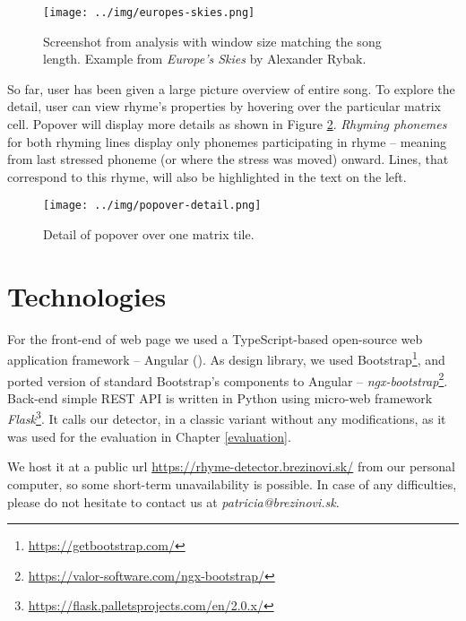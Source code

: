 \begin{figure}[!h]\centering
		\texttt{[image: ../img/europes-skies.png]}
	\caption[Screenshot from analysis with window size matching the song length.]{Screenshot from analysis with window size matching the song length. Example from \textit{Europe's Skies} by Alexander Rybak.}
	\label{web-analysis_window_all}
\end{figure}

So far, user has been given a large picture overview of entire song. To explore the detail, user can view rhyme's properties by hovering over the particular matrix cell. Popover will display more details as shown in Figure \ref{web-popover}. \textit{Rhyming phonemes} for both rhyming lines display only phonemes participating in rhyme -- meaning from last stressed phoneme (or where the stress was moved) onward. Lines, that correspond to this rhyme, will also be highlighted in the text on the left. 

\begin{figure}[h]\centering
		\texttt{[image: ../img/popover-detail.png]}
	\caption{Detail of popover over one matrix tile.}
	\label{web-popover}
\end{figure}


\section{Technologies}
For the front-end of web page we used a TypeScript-based open-source web application framework --  Angular (\cite{angular}). As design library, we used Bootstrap\footnote{\url{https://getbootstrap.com/}}, and ported version of standard Bootstrap's components to Angular -- \textit{ngx-bootstrap}\footnote{\url{https://valor-software.com/ngx-bootstrap/}}. Back-end simple REST API is written in Python using micro-web framework \textit{Flask}\footnote{\url{https://flask.palletsprojects.com/en/2.0.x/}}. It calls our detector, in a classic variant without any modifications, as it was used for the evaluation in Chapter \ref{evaluation}. 

We host it at a public url \url{https://rhyme-detector.brezinovi.sk/} from our personal computer, so some short-term unavailability is possible. In case of any difficulties, please do not hesitate to contact us at \textit{patricia@brezinovi.sk}.

